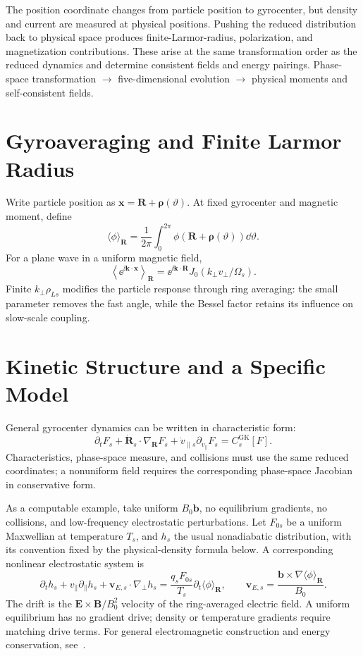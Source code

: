 {The position coordinate changes from particle position to gyrocenter, but density and current are measured at physical positions.
Pushing the reduced distribution back to physical space produces finite-Larmor-radius, polarization, and magnetization contributions.
These arise at the same transformation order as the reduced dynamics and determine consistent fields and energy pairings.}
{Phase-space transformation $\longrightarrow$ five-dimensional evolution $\longrightarrow$ physical moments and self-consistent fields.}

\section{Gyroaveraging and Finite Larmor Radius}
Write particle position as $\bm x=\bm R+\bm\rho(\vartheta)$.
At fixed gyrocenter and magnetic moment, define
\[
\langle\phi\rangle_{\bm R}
=\frac1{2\pi}\int_0^{2\pi}
\phi(\bm R+\bm\rho(\vartheta))\dd\vartheta.
\]
For a plane wave in a uniform magnetic field,
\[
\left\langle\ee^{\ii\bm k\cdot\bm x}\right\rangle_{\bm R}
=\ee^{\ii\bm k\cdot\bm R}
J_0(k_\perp v_\perp/\Omega_s).
\]
Finite $k_\perp\rho_{Ls}$ modifies the particle response through ring averaging: the small parameter removes the fast angle, while the Bessel factor retains its influence on slow-scale coupling.

\section{Kinetic Structure and a Specific Model}
General gyrocenter dynamics can be written in characteristic form:
\[
\partial_tF_s+\dot{\bm R}_s\cdot\nabla_{\bm R}F_s
+\dot v_{\parallel s}\partial_{v_\parallel}F_s=C_s^{\mathrm{GK}}[F].
\]
Characteristics, phase-space measure, and collisions must use the same reduced coordinates;
a nonuniform field requires the corresponding phase-space Jacobian in conservative form.

As a computable example, take uniform $B_0\bm b$, no equilibrium gradients, no collisions, and low-frequency electrostatic perturbations.
Let $F_{0s}$ be a uniform Maxwellian at temperature $T_s$,
and $h_s$ the usual nonadiabatic distribution, with its convention fixed by the physical-density formula below.
A corresponding nonlinear electrostatic system is
\begin{equation}\label{eq:slab-gk}
\partial_th_s+v_\parallel\partial_\parallel h_s
+\bm v_{E,s}\cdot\nabla_\perp h_s
=\frac{q_sF_{0s}}{T_s}\partial_t\langle\phi\rangle_{\bm R},
\qquad
\bm v_{E,s}=\frac{\bm b\times\nabla\langle\phi\rangle_{\bm R}}{B_0}.
\end{equation}
The drift is the $\bm E\times\bm B/B_0^2$ velocity of the ring-averaged electric field.
A uniform equilibrium has no gradient drive; density or temperature gradients require matching drive terms.
For general electromagnetic construction and energy conservation, see~\cite{brizard2007,abel2013}.

